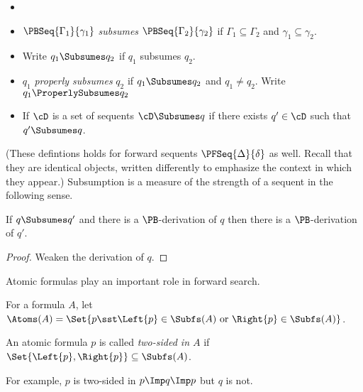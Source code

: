\begin{definition}[Subsumption]
  \begin{itemize}
  \item[]
  \item $\PBSeq{\Gamma_1}{\gamma_1}$ \emph{subsumes}
    $\PBSeq{\Gamma_2}{\gamma_2}$ if $\Gamma_1\subseteq\Gamma_2$
    and $\gamma_1\subseteq\gamma_2$.
  \item Write $q_1\Subsumes q_2$ if $q_1$ subsumes $q_2$.
  \item $q_1$ \emph{properly subsumes} $q_2$ if $q_1\Subsumes q_2$
    and $q_1\neq q_2$.  Write $q_1\ProperlySubsumes q_2$
  \item If $\cD$ is a set of sequents $\cD\Subsumes q$ if
    there exists $q'\in\cD$ such that $q'\Subsumes q$.
  \end{itemize}
\end{definition}

\noindent
(These defintions holds for forward sequents $\PFSeq{\Delta}{\delta}$ as well.
Recall that they are identical objects, written differently to
emphasize the context in which they appear.)
Subsumption is a measure of the strength of a sequent
in the following sense.

\begin{theorem}
  \label{prop.thm.subs}
  If $q\Subsumes q'$ and there is a
  $\PB$-derivation of $q$ then there is a $\PB$-derivation of $q'$.
\end{theorem}
\begin{proof}  Weaken the derivation of $q$. \end{proof}


Atomic formulas play an important role in forward search.

\begin{definition}
  For a formula $A$, let
  $\Atoms(A)=\Set{p\sst \Left{p}\in\Subfs(A) \mbox{ or } \Right{p}\in\Subfs(A)}$.
\end{definition}

\begin{definition}
  An atomic formula $p$ is called \emph{two-sided in $A$}
  if $\Set{\Left{p},\Right{p}} \subseteq \Subfs(A)$.
\end{definition}

\noindent For example, $p$ is two-sided in $p \Imp q \Imp p$
but $q$ is not.

